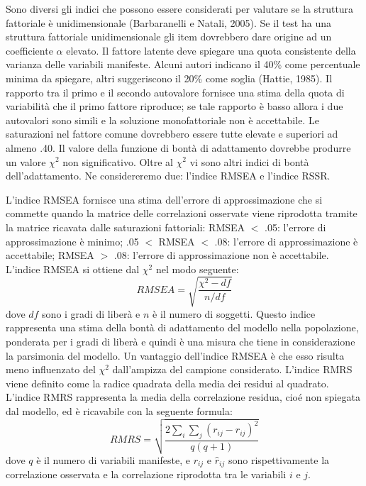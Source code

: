 Sono diversi gli indici che possono essere considerati per valutare se la struttura fattoriale è unidimensionale (Barbaranelli e Natali, 2005).
Se il test ha una struttura fattoriale unidimensionale gli item dovrebbero dare origine ad un coefficiente $\alpha$ elevato. Il fattore latente deve spiegare una quota consistente della varianza delle variabili manifeste.  Alcuni autori indicano il 40\% come percentuale minima da spiegare, altri suggeriscono il 20\% come soglia (Hattie, 1985). Il rapporto tra il primo e il secondo autovalore fornisce una stima della quota di variabilità che il primo fattore riproduce; se tale rapporto è basso allora i due autovalori sono simili e la soluzione monofattoriale non è accettabile.
Le saturazioni nel fattore comune dovrebbero essere tutte elevate e superiori ad almeno .40. Il valore della funzione di bontà di adattamento dovrebbe produrre un valore $\chi^2$ non significativo. 
Oltre al  $\chi^2$ vi sono altri indici di bontà dell’adattamento.  Ne considereremo due: l’indice RMSEA e  l’indice RSSR.

L'indice RMSEA fornisce una stima dell’errore di approssimazione che si commette quando la matrice delle correlazioni osservate viene riprodotta tramite la matrice ricavata dalle saturazioni fattoriali: 
RMSEA $<$ .05:  l’errore di approssimazione è minimo; 
 .05 $<$ RMSEA $<$ .08:  l’errore di approssimazione è accettabile; 
 RMSEA $>$ .08:  l’errore di approssimazione non è accettabile.
L’indice RMSEA si ottiene dal $\chi^2$ nel modo seguente:
\[
RMSEA = \sqrt{ \frac{\chi^2 - df}{n/df} }
\]
dove $df$ sono i gradi di liberà e $n$ è il numero di soggetti. Questo indice rappresenta una stima della bontà di adattamento del modello nella popolazione, ponderata per i gradi di liberà e quindi è una misura che tiene in considerazione la parsimonia del modello. Un vantaggio dell’indice RMSEA è che esso risulta meno influenzato del $\chi^2$ dall’ampizza del campione considerato.
L’indice RMRS viene definito come la radice quadrata della media dei residui al quadrato. L’indice RMRS rappresenta la media della correlazione residua, cioé non spiegata dal modello, ed è ricavabile con la seguente formula:
\[
RMRS = \sqrt{ \frac{2 \sum_i\sum_j(r_{ij} - \hat{r}_{ij})^2}{q(q+1)}  }
\]
dove $q$ è il numero di variabili manifeste, e $r_{ij}$ e $\hat{r}_{ij}$ sono rispettivamente la correlazione osservata e la correlazione riprodotta tra le variabili $i$ e $j$.



